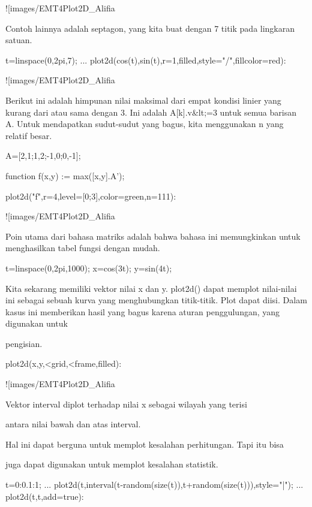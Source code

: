 \documentclass{article}
\begin{document}
![images/EMT4Plot2D_Alifia%

Contoh lainnya adalah septagon, yang kita buat dengan 7 titik pada
lingkaran satuan.


\>t=linspace(0,2pi,7);  ...  
\>    plot2d(cos(t),sin(t),r=1,\>filled,style="/",fillcolor=red):


![images/EMT4Plot2D_Alifia%

Berikut ini adalah himpunan nilai maksimal dari empat kondisi linier
yang kurang dari atau sama dengan 3. Ini adalah A[k].v&lt;=3 untuk semua
barisan A. Untuk mendapatkan sudut-sudut yang bagus, kita menggunakan
n yang relatif besar.


\>A=[2,1;1,2;-1,0;0,-1];

\>function f(x,y) := max([x,y].A');

\>plot2d("f",r=4,level=[0;3],color=green,n=111):


![images/EMT4Plot2D_Alifia%

Poin utama dari bahasa matriks adalah bahwa bahasa ini memungkinkan
untuk menghasilkan tabel fungsi dengan mudah.


\>t=linspace(0,2pi,1000); x=cos(3\*t); y=sin(4\*t);


Kita sekarang memiliki vektor nilai x dan y. plot2d() dapat memplot
nilai-nilai ini sebagai sebuah kurva yang menghubungkan titik-titik.
Plot dapat diisi. Dalam kasus ini memberikan hasil yang bagus karena
aturan penggulungan, yang digunakan untuk


pengisian.


\>plot2d(x,y,<grid,<frame,\>filled):


![images/EMT4Plot2D_Alifia%

Vektor interval diplot terhadap nilai x sebagai wilayah yang terisi


antara nilai bawah dan atas interval.


Hal ini dapat berguna untuk memplot kesalahan perhitungan. Tapi itu
bisa


juga dapat digunakan untuk memplot kesalahan statistik.


\>t=0:0.1:1; ...  
\>    plot2d(t,interval(t-random(size(t)),t+random(size(t))),style="|");  ...  
\>    plot2d(t,t,add=true):
\end{document}
